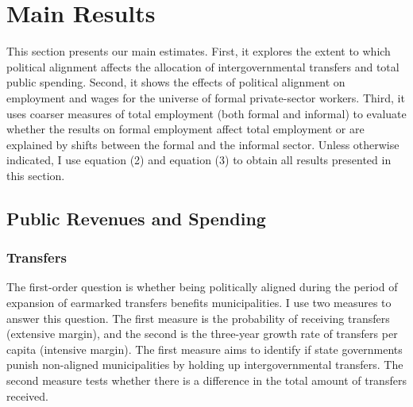 \documentclass[dv_diss_main.tex]{subfiles}
\begin{document}
\section{Main Results}

This section presents our main estimates. First, it explores the extent to which political alignment affects the allocation of intergovernmental transfers and total public spending. Second, it shows the effects of political alignment on employment and wages for the universe of formal private-sector workers. Third, it uses coarser measures of total employment (both formal and informal) to evaluate whether the results on formal employment affect total employment or are explained by shifts between the formal and the informal sector. Unless otherwise indicated, I use equation (2) and equation (3) to obtain all results presented in this section.

\subsection{Public Revenues and Spending}

\subsubsection{Transfers} 
The first-order question is whether being politically aligned during the period of expansion of earmarked transfers benefits municipalities. I use two measures to answer this question. The first measure is the probability of receiving transfers (extensive margin), and the second is the three-year growth rate of transfers per capita (intensive margin). The first measure aims to identify if state governments punish non-aligned municipalities by holding up intergovernmental transfers. The second measure tests whether there is a difference in the total amount of transfers received.
\end{document}
